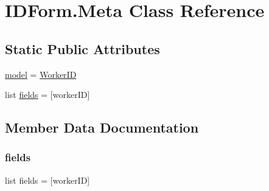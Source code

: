 \hypertarget{classdynamicfilterapp_1_1forms_1_1_i_d_form_1_1_meta}{}\section{I\+D\+Form.\+Meta Class Reference}
\label{classdynamicfilterapp_1_1forms_1_1_i_d_form_1_1_meta}
\subsection*{Static Public Attributes}
\begin{DoxyCompactItemize}
\item 
\hyperlink{classdynamicfilterapp_1_1forms_1_1_i_d_form_1_1_meta_a508cc3106d2c29fe07dc87cbe3ea6927}{model} = \hyperlink{classdynamicfilterapp_1_1models_1_1_worker_i_d}{Worker\+ID}
\item 
list \hyperlink{classdynamicfilterapp_1_1forms_1_1_i_d_form_1_1_meta_a95a6920fe0e5c16303574629629ce2c1}{fields} = \mbox{[}\textquotesingle{}worker\+ID\textquotesingle{}\mbox{]}
\end{DoxyCompactItemize}


\subsection{Member Data Documentation}
\mbox{\label{classdynamicfilterapp_1_1forms_1_1_i_d_form_1_1_meta_a95a6920fe0e5c16303574629629ce2c1}} 
\subsubsection{\texorpdfstring{fields}{fields}}
{\footnotesize\ttfamily list fields = \mbox{[}\textquotesingle{}worker\+ID\textquotesingle{}\mbox{]}\hspace{0.3cm}{\ttfamily [static]}}

\mbox{\label{classdynamicfilterapp_1_1forms_1_1_i_d_form_1_1_meta_a508cc3106d2c29fe07dc87cbe3ea6927}} 
